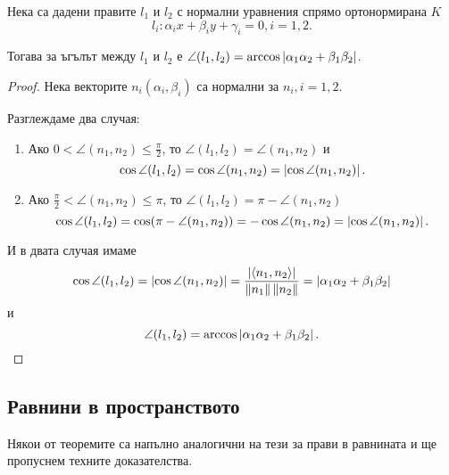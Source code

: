 \documentclass[numbers=endperiod, DIV=15]{scrartcl}
\begin{document}
\begin{theorem}
  Нека са дадени правите $l_1$ и $l_2$ с нормални уравнения спрямо ортонормирана $K$
  \begin{displaymath}
    l_i: \alpha_i x + \beta_i y + \gamma_i = 0, i = 1, 2.
  \end{displaymath}

  Тогава за ъгълът между $l_1$ и $l_2$ е $\angle(l_1, l_2) = \arccos \left\vert \alpha_1 \alpha_2 + \beta_1 \beta_2 \right\vert$.
\end{theorem}
\begin{proof}
  Нека векторите $n_i(\alpha_i, \beta_i)$ са нормални за $n_i, i = 1, 2$.

  Разглеждаме два случая:
  \begin{enumerate}
    \item Ако $0 < \angle(n_1, n_2) \leq \frac {\pi} 2$, то $\angle(l_1, l_2) = \angle(n_1, n_2)$ и
    \begin{displaymath}
      \cos \angle (l_1, l_2)
      =
      \cos \angle(n_1, n_2)
      =
      \left\vert \cos \angle (n_1, n_2) \right\vert.
    \end{displaymath}

    \item Ако $\frac {\pi} 2 < \angle(n_1, n_2) \leq \pi$, то $\angle(l_1, l_2) = \pi - \angle(n_1, n_2)$
    \begin{displaymath}
      \cos \angle (l_1, l_2)
      =
      \cos (\pi - \angle(n_1, n_2))
      =
      -\cos \angle(n_1, n_2)
      =
      \left\vert \cos \angle (n_1, n_2) \right\vert.
    \end{displaymath}
  \end{enumerate}

  И в двата случая имаме
  \begin{displaymath}
    \cos \angle(l_1, l_2)
    =
    \left\vert \cos \angle(n_1, n_2) \right\vert
    =
    \frac {\left\vert \left\langle n_1, n_2 \right\rangle \right\vert} {\left\Vert n_1 \right\Vert \left\Vert n_2 \right\Vert}
    =
    \left\vert \alpha_1 \alpha_2 + \beta_1 \beta_2 \right\vert
  \end{displaymath}
  и
  \begin{displaymath}
    \angle(l_1, l_2)
    =
    \arccos \left\vert \alpha_1 \alpha_2 + \beta_1 \beta_2 \right\vert.
  \end{displaymath}
\end{proof}

\subsection{Равнини в пространството}

\begin{note}
  Някои от теоремите са напълно аналогични на тези за прави в равнината и ще пропуснем техните доказателства.
\end{note}
\end{document}
